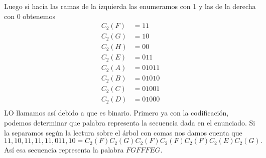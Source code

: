 \begin{sols}
\begin{center}
    \end{center}
Luego si hacia las ramas de la izquierda las enumeramos con 1 y las de la derecha con 0 obtenemos
\begin{align*}
    C_2(F)&=11\\
    C_2(G)&=10\\
    C_2(H)&=00\\
    C_2(E)&=011\\
    C_2(A)&=01011\\
    C_2(B)&=01010\\
    C_2(C)&=01001\\
    C_2(D)&=01000\\
\end{align*}
LO llamamos así debido a que es binario. Primero ya con la codificación, podemos determinar que palabra representa la secuencia dada en el enunciado. Si la separamos según la lectura sobre el árbol con comas nos damos cuenta que
$$11,10,11,11,11,011,10=C_2(F)C_2(G)C_2(F)C_2(F)C_2(F)C_2(E)C_2(G).$$
Así esa secuencia representa la palabra $FGFFFEG.$\\


\end{sols}
